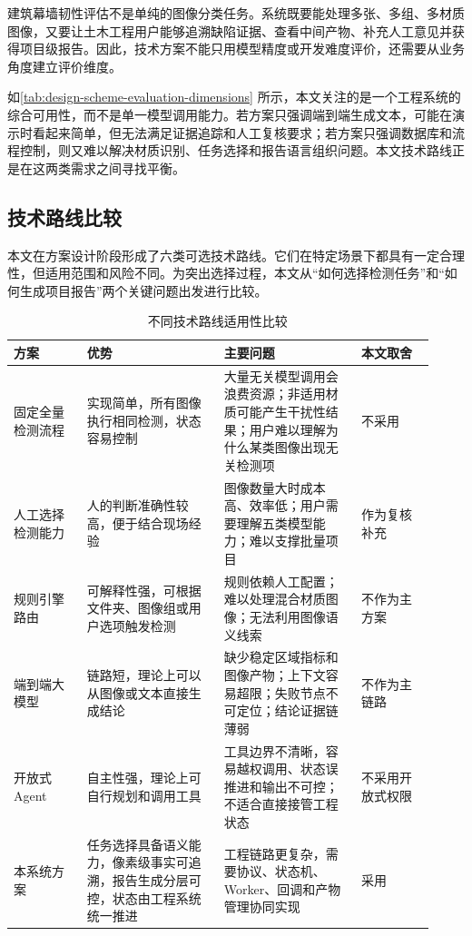 建筑幕墙韧性评估不是单纯的图像分类任务。系统既要能处理多张、多组、多材质图像，又要让土木工程用户能够追溯缺陷证据、查看中间产物、补充人工意见并获得项目级报告。因此，技术方案不能只用模型精度或开发难度评价，还需要从业务角度建立评价维度。

如\cref{tab:design-scheme-evaluation-dimensions} 所示，本文关注的是一个工程系统的综合可用性，而不是单一模型调用能力。若方案只强调端到端生成文本，可能在演示时看起来简单，但无法满足证据追踪和人工复核要求；若方案只强调数据库和流程控制，则又难以解决材质识别、任务选择和报告语言组织问题。本文技术路线正是在这两类需求之间寻找平衡。

\subsection{技术路线比较}
\label{subsec:design-technical-route-comparison}

本文在方案设计阶段形成了六类可选技术路线。它们在特定场景下都具有一定合理性，但适用范围和风险不同。为突出选择过程，本文从“如何选择检测任务”和“如何生成项目报告”两个关键问题出发进行比较。

\begin{table}[!htb]
  \caption{不同技术路线适用性比较}\label{tab:design-technical-route-comparison}
  \centering
  \begin{tabular}{@{}p{0.16\linewidth}p{0.3\linewidth}p{0.3\linewidth}p{0.16\linewidth}@{}} \toprule
    \textbf{方案} & \textbf{优势} & \textbf{主要问题} & \textbf{本文取舍} \\ \midrule
    固定全量检测流程 & 实现简单，所有图像执行相同检测，状态容易控制 & 大量无关模型调用会浪费资源；非适用材质可能产生干扰性结果；用户难以理解为什么某类图像出现无关检测项 & 不采用 \\
    人工选择检测能力 & 人的判断准确性较高，便于结合现场经验 & 图像数量大时成本高、效率低；用户需要理解五类模型能力；难以支撑批量项目 & 作为复核补充 \\
    规则引擎路由 & 可解释性强，可根据文件夹、图像组或用户选项触发检测 & 规则依赖人工配置；难以处理混合材质图像；无法利用图像语义线索 & 不作为主方案 \\
    端到端大模型 & 链路短，理论上可以从图像或文本直接生成结论 & 缺少稳定区域指标和图像产物；上下文容易超限；失败节点不可定位；结论证据链薄弱 & 不作为主链路 \\
    开放式 Agent & 自主性强，理论上可自行规划和调用工具 & 工具边界不清晰，容易越权调用、状态误推进和输出不可控；不适合直接接管工程状态 & 不采用开放式权限 \\
    本系统方案 & 任务选择具备语义能力，像素级事实可追溯，报告生成分层可控，状态由工程系统统一推进 & 工程链路更复杂，需要协议、状态机、Worker、回调和产物管理协同实现 & 采用 \\ \bottomrule
  \end{tabular}
\end{table}

